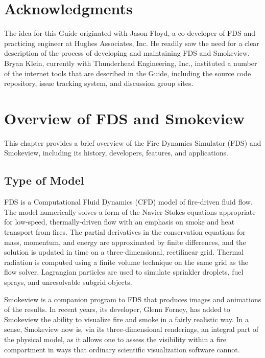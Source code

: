 \documentclass[11pt]{book}
\begin{document}
\chapter{Acknowledgments}

\label{acksection}

The idea for this Guide originated with Jason Floyd, a co-developer of FDS and practicing engineer at Hughes Associates, Inc. He readily saw the need for a clear description of the process of developing and maintaining FDS and Smokeview. Bryan Klein, currently with Thunderhead Engineering, Inc., instituted a number of the internet tools that are described in the Guide, including the source code repository, issue tracking system, and discussion group sites.


\newpage

\tableofcontents

\mainmatter


\chapter{Overview of FDS and Smokeview}

This chapter provides a brief overview of the Fire Dynamics Simulator (FDS) and Smokeview, including its history, developers, features, and applications.


\section{Type of Model}

FDS is a Computational Fluid Dynamics (CFD) model of fire-driven fluid flow. The model numerically solves a form of the Navier-Stokes equations
appropriate for low-speed, thermally-driven flow with an emphasis on smoke and heat transport from fires. The partial derivatives in the conservation
equations for mass, momentum, and energy are approximated by finite differences, and the solution is updated in time on a three-dimensional,
rectilinear grid. Thermal radiation is computed using a finite volume technique on the same grid as the flow solver. Lagrangian particles are used to
simulate sprinkler droplets, fuel sprays, and unresolvable subgrid objects.

Smokeview is a companion program to FDS that produces images and animations of the results. In recent years, its developer, Glenn Forney, has added
to Smokeview the ability to visualize fire and smoke in a fairly realistic way. In a sense, Smokeview now is, via its three-dimensional renderings,
an integral part of the physical model, as it allows one to assess the visibility within a fire compartment in ways that ordinary scientific
visualization software cannot.
\end{document}
